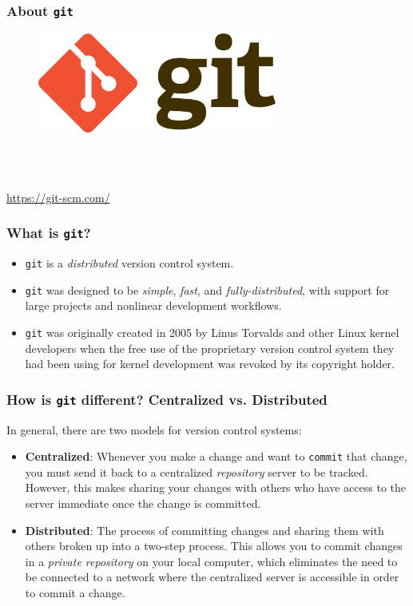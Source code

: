 \documentclass{beamer}
\begin{document}
\begin{frame}
   \frametitle{About \texttt{git}}
   \begin{figure}[htbp]
      \includegraphics[width=0.7\textwidth]{images/git-logo.png}
   \end{figure}
   \ \\ \ \\ 
   \begin{center}
      \url{https://git-scm.com/}
   \end{center}
\end{frame}

\begin{frame}
   \frametitle{What is \texttt{git}?}
   \begin{itemize}
      \setlength\itemsep{1.0em}
      \item \texttt{git} is a \textit{distributed} version control 
         system.
      \item \texttt{git} was designed to be \textit{simple}, 
         \textit{fast}, and \textit{fully-distributed}, with support for 
         large projects and nonlinear development workflows.
      \item \texttt{git} was originally created in 2005 by Linus 
         Torvalds and other Linux kernel developers when the free use of 
         the proprietary version control system they had been using for 
         kernel development was revoked by its copyright holder.
   \end{itemize}
\end{frame}

\begin{frame}
   \frametitle{How is \texttt{git} different? Centralized vs. Distributed}
   In general, there are two models for version control systems: \\
   \begin{itemize}
      \setlength\itemsep{1.0em}
      \item \textbf{Centralized}: Whenever you make a change and want to 
         \texttt{commit} that change, you must send it back to a 
         centralized \textit{repository} server to be tracked. However, 
         this makes sharing your changes with others who have access to 
         the server immediate once the change is committed. 
      \item \textbf{Distributed}: The process of committing changes and 
         sharing them with others broken up into a two-step process. 
         This allows you to commit changes in a 
         \textit{private repository} on your local computer, which 
         eliminates the need to be connected to a network where the 
         centralized server is accessible in order to commit a change. 
   \end{itemize}
\end{frame}
\end{document}
